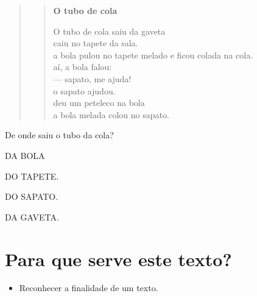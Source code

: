 \begin{quote}
\begin{verse}
\textbf{O tubo de cola}

O tubo de cola saiu da gaveta\\
caiu no tapete da sala.\\
a bola pulou no tapete melado e ficou colada na cola.\\
aí, a bola falou:\\
--- sapato, me ajuda!\\
o sapato ajudou.\\
deu um peteleco na bola\\
a bola melada colou no sapato.
\end{verse}


\end{quote}

De onde saiu o tubo da cola?

\begin{escolha}
\item DA BOLA

\item DO TAPETE.

\item DO SAPATO.

\item DA GAVETA.
\end{escolha}

\chapter{Para que serve este texto?}



\begin{itemize}
\item Reconhecer a finalidade de um texto.
\end{itemize}


